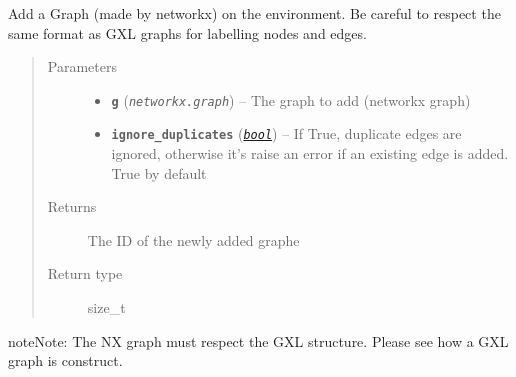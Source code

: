 \documentclass[letterpaper,10pt,english]{sphinxmanual}
\begin{document}
\begin{fulllineitems}
\label{doc:gedlibpy.add_nx_graph}
Add a Graph (made by networkx) on the environment. Be careful to respect the same format as GXL graphs for labelling nodes and edges.
\begin{quote}\begin{description}
\item[{Parameters}] \leavevmode\begin{itemize}
\item {} 
\textbf{\texttt{g}} (\emph{\texttt{networkx.graph}}) -- The graph to add (networkx graph)

\item {} 
\textbf{\texttt{ignore\_duplicates}} (\href{https://docs.python.org/3/library/functions.html\#bool}{\emph{\texttt{bool}}}) -- If True, duplicate edges are ignored, otherwise it's raise an error if an existing edge is added. True by default

\end{itemize}

\item[{Returns}] \leavevmode
The ID of the newly added graphe

\item[{Return type}] \leavevmode
size\_t

\end{description}\end{quote}

\begin{notice}{note}{Note:}
The NX graph must respect the GXL structure. Please see how a GXL graph is construct.
\end{notice}

\end{fulllineitems}

\end{document}
